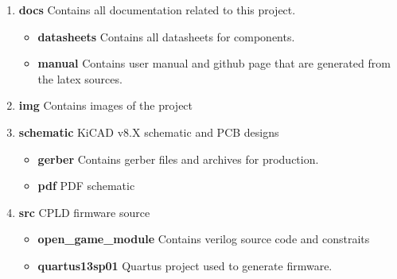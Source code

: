 \begin{enumerate}
  \item \textbf{docs} Contains all documentation related to this project.
    \begin{itemize}
      \item \textbf{datasheets} Contains all datasheets for components.
      \item \textbf{manual} Contains user manual and github page that are generated from the latex sources.
    \end{itemize}
  \item \textbf{img} Contains images of the project
  \item \textbf{schematic} KiCAD v8.X schematic and PCB designs
    \begin{itemize}
      \item \textbf{gerber} Contains gerber files and archives for production.
      \item \textbf{pdf} PDF schematic
    \end{itemize}
  \item \textbf{src} CPLD firmware source
    \begin{itemize}
      \item \textbf{open\_game\_module} Contains verilog source code and constraits
      \item \textbf{quartus13sp01} Quartus project used to generate firmware.
    \end{itemize}
\end{enumerate}
